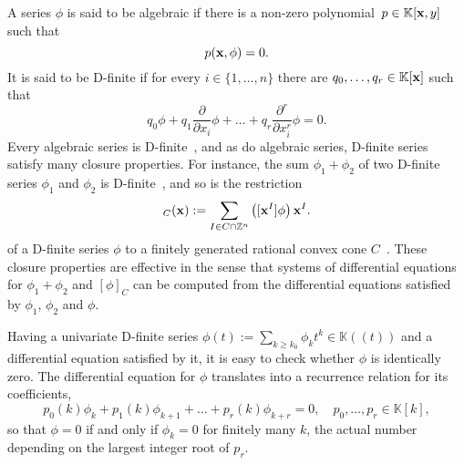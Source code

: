 \documentclass[a4paper,draft]{amsart}
\theoremstyle{definition}
\begin{document}
A series $\phi$ is said to be algebraic if there is a non-zero polynomial~$p\in\mathbb{K}[\bold{x},y]$ such that 
\begin{equation*}
p(\bold{x},\phi) = 0.
\end{equation*}
It is said to be D-finite if for every $i\in\{1,\dots,n\}$ there are $q_0,\dots,q_r\in\mathbb{K}[\bold{x}]$ such that 
\begin{equation*}
q_0 \phi + q_1 \frac{\partial}{\partial x_i}\phi + \dots + q_r \frac{\partial^r}{\partial x_i^r}\phi = 0.
\end{equation*}
Every algebraic series is D-finite~\cite[Theorem 6.1]{kauers2011concrete}, and as do algebraic series, D-finite series satisfy many closure properties. For instance, the sum $\phi_1 + \phi_2$ of two D-finite series $\phi_1$ and $\phi_2$ is D-finite~\cite[Theorem 7.2]{kauers2011concrete}, and so is the restriction 
\begin{equation*}
[\phi]_C(\bold{x}) := \sum_{I\in C\cap \mathbb{Z}^n}\left( [\bold{x}^I]\phi\right) \bold{x}^I.
\end{equation*}
of a D-finite series $\phi$ to a finitely generated rational convex cone $C$~\cite{bostan2017hypergeometric}.
These closure properties are effective in the sense that systems of differential equations for $\phi_1 + \phi_2$ and $[\phi]_C$ can be computed from the differential equations satisfied by $\phi_1$, $\phi_2$ and $\phi$. 

Having a univariate D-finite series $\phi(t) := \sum_{k\geq k_0} \phi_k t^k \in\mathbb{K}((t))$ and a differential equation satisfied by it, it is easy to check whether $\phi$ is identically zero. The differential equation for $\phi$ translates into a recurrence relation for its coefficients,
\begin{equation*}
p_0(k) \phi_k + p_1(k)\phi_{k+1} + \dots + p_r(k)\phi_{k+r} = 0, \quad p_0,\dots,p_r \in\mathbb{K}[k],
\end{equation*}
so that $\phi = 0$ if and only if $\phi_k = 0$ for finitely many $k$, the actual number depending on the largest integer root of $p_r$.\\
\end{document}
